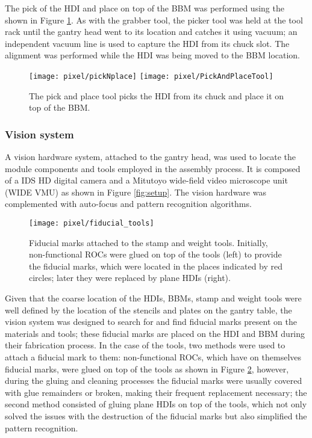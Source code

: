 The pick of the HDI and place on top of the BBM was performed using the  shown in Figure \ref{fig:pandp_tool}. As with the grabber tool, the picker tool was held at the tool rack until the gantry head went to its location and catches it using vacuum; an independent vacuum line is used to capture the HDI from its chuck slot. The alignment was performed while the HDI was being moved to the BBM location.      
\begin{figure}[!h]
  \centering  
  \texttt{[image: pixel/pickNplace]}
  \texttt{[image: pixel/PickAndPlaceTool]}
  \caption[Pick and place tool.]{The pick and place tool picks the HDI from its chuck and place it on top of the BBM.}\label{fig:pandp_tool}
\end{figure}

\subsubsection*{Vision system}

A vision hardware system, attached to the gantry head, was used to locate the module components and tools employed in the assembly process. It is composed of a IDS HD digital camera and a Mitutoyo wide-field video microscope unit (WIDE VMU) as shown in Figure \ref{fig:setup}. The vision hardware was complemented with auto-focus and pattern recognition algorithms. 

\begin{figure}[!h]
  \centering  
  \texttt{[image: pixel/fiducial\_tools]}\\
  \caption[Fiducial marks on tools.]{Fiducial marks attached to the stamp and weight tools. Initially, non-functional ROCs were glued on top of the tools (left) to provide the fiducial marks, which were located in the places indicated by red circles; later they were replaced by plane HDIs (right).}\label{fig:fiducial_tools}
\end{figure}

Given that the coarse location of the HDIs, BBMs, stamp and weight tools were well defined by the location of the stencils and plates on the gantry table, the vision system was designed to search for and find fiducial marks present on the materials and tools; these fiducial marks are placed on the HDI and BBM during their fabrication process. In the case of the tools, two methods were used to attach a fiducial mark to them: non-functional ROCs, which have on themselves fiducial marks, were glued on top of the tools as shown in Figure \ref{fig:fiducial_tools}, however, during the gluing and cleaning processes the fiducial marks were usually covered with glue remainders or broken, making their frequent replacement necessary; the second method consisted of gluing plane HDIs on top of the tools, which not only solved the issues with the destruction of the fiducial marks but also simplified the pattern recognition.

